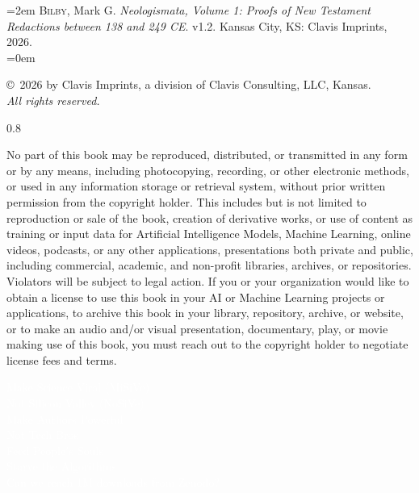 \begin{flushleft}%
\hangindent=2em \textsc{Bilby}, Mark G. \textit{Neologismata, Volume 1: Proofs of New Testament Redactions between 138 and 249 CE}. %
v1.2. Kansas City, KS: Clavis Imprints, 2026.\\%
\hangindent=0em%
%
\vspace*{10mm} %

\copyright\ 2026 by Clavis Imprints, a division of Clavis Consulting, LLC, Kansas. \\%
\textit{All rights reserved.} \\

\vspace*{10mm} %

\justifying
\begin{spacing}{0.8}
\begin{footnotesize}
\noindent{}No part of this book may be reproduced, distributed, or transmitted in any form or by any means, %
including photocopying, recording, or other electronic methods, %
or used in any information storage or retrieval system, %
without prior written permission from the copyright holder. %
This includes but is not limited to reproduction or sale of the book, creation of derivative works, %
or use of content as training or input data for Artificial Intelligence Models, Machine Learning, online videos, podcasts, %
or any other applications, presentations both private and public, %
including commercial, academic, and non-profit libraries, archives, or repositories. %
Violators will be subject to legal action. If you or your organization would like to obtain a license %
to use this book in your AI or Machine Learning projects or applications, %
to archive this book in your library, repository, archive, or website, %
or to make an audio and/or visual presentation, documentary, play, or movie making use of this book, %
you must reach out to the copyright holder to negotiate license fees and terms. 
\vspace*{1mm} %

\noindent{}\textcolor{white}{Make Science Viral (MiSiVe) \\ Not Silicon Valley (NoSiVe) \\ %
Make Authors Powerful \\ Not Tech Bros \\ Feed Peopleʼs Souls \\ Starve the Algorithms \\ %
Can we reach 1M downloads from Zenodo?}

\vspace*{1mm} %


\end{footnotesize}
\end{spacing}
\end{flushleft}
